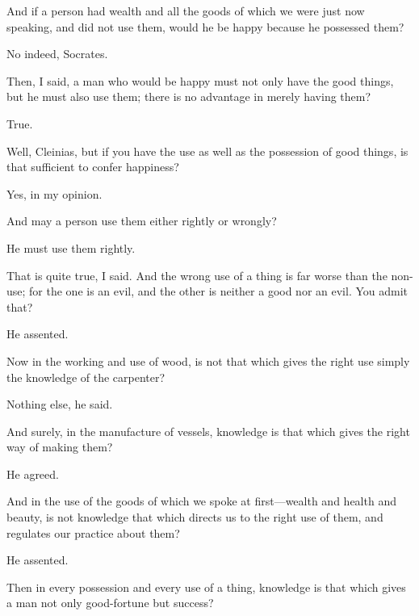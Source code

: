 \documentclass[11pt,letter]{article}
\begin{document}
\par  And if a person had wealth and all the goods of which we were just now speaking, and did not use them, would he be happy because he possessed them?

\par  No indeed, Socrates.

\par  Then, I said, a man who would be happy must not only have the good things, but he must also use them; there is no advantage in merely having them?

\par  True.

\par  Well, Cleinias, but if you have the use as well as the possession of good things, is that sufficient to confer happiness?

\par  Yes, in my opinion.

\par  And may a person use them either rightly or wrongly?

\par  He must use them rightly.

\par  That is quite true, I said. And the wrong use of a thing is far worse than the non-use; for the one is an evil, and the other is neither a good nor an evil. You admit that?

\par  He assented.

\par  Now in the working and use of wood, is not that which gives the right use simply the knowledge of the carpenter?

\par  Nothing else, he said.

\par  And surely, in the manufacture of vessels, knowledge is that which gives the right way of making them?

\par  He agreed.

\par  And in the use of the goods of which we spoke at first—wealth and health and beauty, is not knowledge that which directs us to the right use of them, and regulates our practice about them?

\par  He assented.

\par  Then in every possession and every use of a thing, knowledge is that which gives a man not only good-fortune but success?
\end{document}
